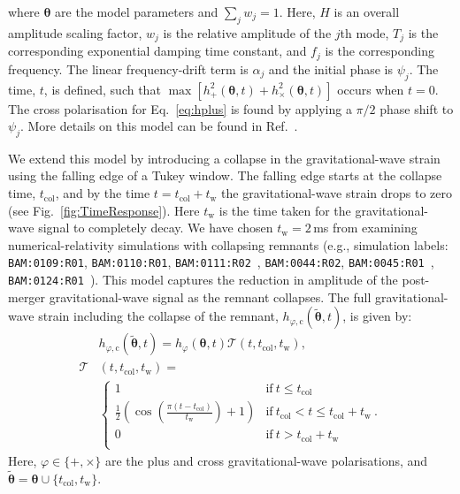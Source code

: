 \documentclass[
reprint,
prd,
twocolumn,
nofootinbib,
 amsmath,
showpacs ,amssymb, aps,%
superscriptaddress
]{revtex4-1}
\newcommand{\tc}{t_{\mathrm{col}}}
\newcommand{\tw}{t_{\mathrm{w}}}
\begin{document}
    where $\boldsymbol{\theta}$ are the model parameters and $\sum_{j} w_j=1$. 
    Here, $H$ is an overall amplitude scaling factor, $w_j$ is the relative amplitude of the $j$th mode, $T_j$ is the corresponding exponential damping time constant, and $f_j$ is the corresponding frequency.
    The linear frequency-drift term is $\alpha_j$ and the initial phase  is $\psi_j$.
    The time, $t$, is defined, such that $\max\left[h_+^2(\boldsymbol{\theta},t)+h_\times^2(\boldsymbol{\theta},t)\right]$ occurs when $t=0$. 
    The cross polarisation for Eq.~\ref{eq:hplus} is found by applying a $\pi/2$ phase shift to $\psi_j$.
    More details on this model can be found in Ref.~\cite{Easter2020}.
    
    We extend this model by introducing a collapse in the gravitational-wave strain using the falling edge of a Tukey window.
    The falling edge starts at the collapse time, $\tc$, and by the time $t=\tc+\tw$ the gravitational-wave strain drops to zero (see Fig.~\ref{fig:TimeResponse}). 
    Here $\tw$ is the time taken for the gravitational-wave signal to completely decay.
    We have chosen $\tw=2$\,ms from examining numerical-relativity simulations with collapsing remnants (e.g., simulation labels: \texttt{BAM:0109:R01}, \texttt{BAM:0110:R01}, \texttt{BAM:0111:R02}~\cite{Dietrich2018}, \texttt{BAM:0044:R02}, \texttt{BAM:0045:R01}~\cite{Dietrich2017c}, \texttt{BAM:0124:R01}~\cite{Dietrich2017}).
    This model captures the reduction in amplitude of the post-merger gravitational-wave signal as the remnant collapses.
    The full gravitational-wave strain including the collapse of the remnant, $h_{\varphi,\mathrm{c}}(\boldsymbol{\tilde{\theta}},t)$, is given by:
\begin{align}
        & h_{\varphi,\mathrm{c}}(\boldsymbol{\tilde{\theta}},t)    =  h_{\varphi}(\boldsymbol{\theta},t)\mathcal{T}\left(t , \tc,\tw\right), \label{eq:hcol}\\ 
        \mathcal{T} & (t,\tc,\tw) =    \nonumber  \\
        &\begin{cases} 
            1 &\text{if}\ t \leqslant  \tc \\ 
            \frac{1}{2}\left(\cos\left(\frac{\pi (t-\tc)}{\tw}\right) +1 \right)  &\text{if}\ \tc < t \leqslant \tc+\tw\ \text{.} \label{eq:tukeyfallingedge} \\
            0  &\text{if}\  t > \tc+\tw\\ 
        \end{cases}
\end{align}
    Here, $\varphi\in\{+,\times\}$ are the plus and cross gravitational-wave polarisations, and $\boldsymbol{\tilde{\theta}}= \boldsymbol{\theta} \cup \{\tc,\tw\}$. \par
    
\end{document}

